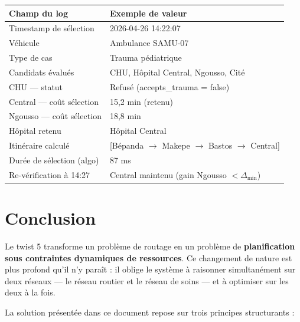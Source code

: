 \documentclass[12pt,a4paper]{article}
\theoremstyle{definition}
\theoremstyle{remark}
\begin{document}
\begin{center}
\begin{tabular}{ll}
  \toprule
  \textbf{Champ du log} & \textbf{Exemple de valeur} \\
  \midrule
  Timestamp de sélection         & 2026-04-26 14:22:07 \\
  Véhicule                       & Ambulance SAMU-07 \\
  Type de cas                    & Trauma pédiatrique \\
  Candidats évalués              & CHU, Hôpital Central, Ngousso, Cité \\
  CHU — statut                   & Refusé (accepts\_trauma = false) \\
  Central — coût sélection       & 15,2 min (retenu) \\
  Ngousso — coût sélection       & 18,8 min \\
  Hôpital retenu                 & Hôpital Central \\
  Itinéraire calculé             & [Bépanda $\to$ Makepe $\to$ Bastos $\to$ Central] \\
  Durée de sélection (algo)      & 87 ms \\
  Re-vérification à 14:27        & Central maintenu (gain Ngousso $< \Delta_{\min}$) \\
  \bottomrule
\end{tabular}
\end{center}

\newpage

\section*{Conclusion}

Le twist 5 transforme un problème de routage en un problème de
\textbf{planification sous contraintes dynamiques de ressources}.
Ce changement de nature est plus profond qu'il n'y paraît : il oblige
le système à raisonner simultanément sur deux réseaux — le réseau
routier et le réseau de soins — et à optimiser sur les deux à la fois.

\medskip
La solution présentée dans ce document repose sur trois principes
structurants :
\end{document}
